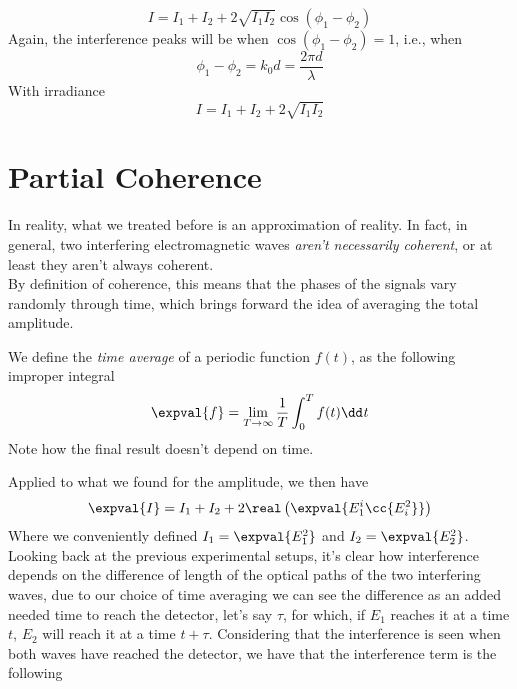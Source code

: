\documentclass[../electromagnetism.tex]{subfiles}
\begin{document}
\begin{equation*}
	I=I_1+I_2+2\sqrt{I_1I_2}\cos\left( \phi_1-\phi_2 \right)
\end{equation*}
Again, the interference peaks will be when $\cos\left( \phi_1-\phi_2 \right)=1$, i.e., when
\begin{equation}
	\phi_1-\phi_2=k_0d=\frac{2\pi d}{\lambda}
	\label{eq:interferencepeaksmichmorley}
\end{equation}
With irradiance
\begin{equation}
	I=I_1+I_2+2\sqrt{I_1I_2}
	\label{eq:peakintmichmorley}
\end{equation}
\section{Partial Coherence}
In reality, what we treated before is an approximation of reality. In fact, in general, two interfering electromagnetic waves \textit{aren't necessarily coherent}, or at least they aren't always coherent.\\
By definition of coherence, this means that the phases of the signals vary randomly through time, which brings forward the idea of averaging the total amplitude.
\begin{dfn}
	We define the \emph{time average} of a periodic function $f(t)$, as the following improper integral
	\begin{equation}
		\expval{f}=\lim_{T\to\infty}\frac{1}{T}\int_{0}^{T}f(t)\dd^{}{t}
		\label{eq:timeaveragedfn}
	\end{equation}
	Note how the final result doesn't depend on time.
\end{dfn}
Applied to what we found for the amplitude, we then have
\begin{equation}
	\expval{I}=I_1+I_2+2\real\left( \expval{E_1^i\cc{E_i^2}} \right)
	\label{eq:intterm}
\end{equation}
Where we conveniently defined $I_1=\expval{E_1^2}$ and $I_2=\expval{E_2^2}$.\\
Looking back at the previous experimental setups, it's clear how interference depends on the difference of length of the optical paths of the two interfering waves, due to our choice of time averaging we can see the difference as an added needed time to reach the detector, let's say $\tau$, for which, if $E_1$ reaches it at a time $t$, $E_2$ will reach it at a time $t+\tau$. Considering that the interference is seen when both waves have reached the detector, we have that the interference term is the following
\end{document}
